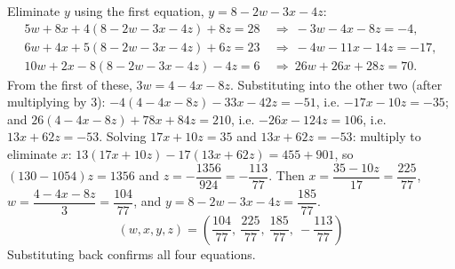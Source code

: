 Eliminate $y$ using the first equation, $y=8-2w-3x-4z$:
\[
\begin{aligned}
5w+8x+4(8-2w-3x-4z)+8z=28&\ \Longrightarrow\ -3w-4x-8z=-4,\\
6w+4x+5(8-2w-3x-4z)+6z=23&\ \Longrightarrow\ -4w-11x-14z=-17,\\
10w+2x-8(8-2w-3x-4z)-4z=6&\ \Longrightarrow\ 26w+26x+28z=70 .
\end{aligned}
\]
From the first of these, $3w=4-4x-8z$. Substituting into the other two (after multiplying by $3$): $-4(4-4x-8z)-33x-42z=-51$, i.e. $-17x-10z=-35$; and $26(4-4x-8z)+78x+84z=210$, i.e. $-26x-124z=106$, i.e. $13x+62z=-53$. Solving $17x+10z=35$ and $13x+62z=-53$: multiply to eliminate $x$: $13(17x+10z)-17(13x+62z)=455+901$, so $(130-1054)z=1356$ and $z=-\dfrac{1356}{924}=-\dfrac{113}{77}$. Then $x=\dfrac{35-10z}{17}=\dfrac{225}{77}$, $w=\dfrac{4-4x-8z}{3}=\dfrac{104}{77}$, and $y=8-2w-3x-4z=\dfrac{185}{77}$.
\[
\boxed{(w,x,y,z)=\left(\dfrac{104}{77},\ \dfrac{225}{77},\ \dfrac{185}{77},\ -\dfrac{113}{77}\right)}
\]
Substituting back confirms all four equations.
